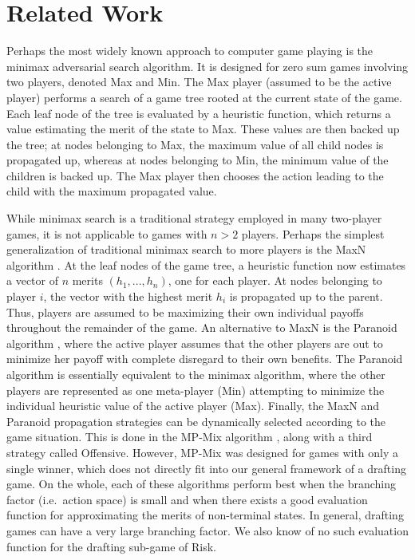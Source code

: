 \documentclass[letterpaper]{article}
\numberwithin{equation}{section}
\numberwithin{theorem}{section}
\numberwithin{lemma}{section}
\numberwithin{df}{section}
\begin{document}
\section{Related Work}

Perhaps the most widely known approach to computer game playing is the minimax adversarial search algorithm.  It is designed for zero sum games involving two players, denoted Max and Min.  The Max player (assumed to be the active player) performs a search of a game tree rooted at the current state of the game.  Each leaf node of the tree is evaluated by a heuristic function, which returns a value estimating the merit of the state to Max.  These values are then backed up the tree; at nodes belonging to Max, the maximum value of all child nodes is propagated up, whereas at nodes belonging to Min, the minimum value of the children is backed up.  The Max player then chooses the action leading to the child with the maximum propagated value.


While minimax search is a traditional strategy employed in many two-player games, it is not applicable to games with $n > 2$ players.  Perhaps the simplest generalization of traditional minimax search to more players is the MaxN algorithm \cite{MaxN}.  At the leaf nodes of the game tree, a heuristic function now estimates a vector of $n$ merits $(h_1, ..., h_n)$, one for each player.  At nodes belonging to player $i$, the vector with the highest merit $h_i$ is propagated up to the parent.  Thus, players are assumed to be maximizing their own individual payoffs throughout the remainder of the game.  An alternative to MaxN is the Paranoid algorithm \cite{Paranoid}, where the active player assumes that the other players are out to minimize her payoff with complete disregard to their own benefits.  The Paranoid algorithm is essentially equivalent to the minimax algorithm, where the other players are represented as one meta-player (Min) attempting to minimize the individual heuristic value of the active player (Max).  Finally, the MaxN and Paranoid propagation strategies can be dynamically selected according to the game situation.  This is done in the MP-Mix algorithm \cite{ZuckFelnerKraus2009}, along with a third strategy called Offensive.  However, MP-Mix was designed for games with only a single winner, which does not directly fit into our general framework of a drafting game.  On the whole, each of these algorithms perform best when the branching factor (i.e.~action space) is small and when there exists a good evaluation function for approximating the merits of non-terminal states.  In general, drafting games can have a very large branching factor.  We also know of no such evaluation function for the drafting sub-game of Risk.
\end{document}
